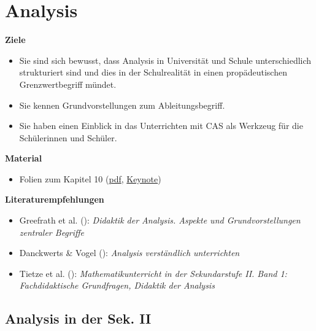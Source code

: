 \documentclass[
]{scrbook}
\providecommand{\tightlist}{%
  \setlength{\itemsep}{0pt}\setlength{\parskip}{0pt}}
\renewenvironment{quote}{
  \list{}{
	\leftmargin0.2cm   %
    \rightmargin\leftmargin
      	\def\FrameCommand
    {%
        {\color{quoteColor}\vrule width 2pt}%
        \hspace{0pt}%
    }%
    \MakeFramed{\advance \hsize -\width \FrameRestore}    \color{quoteColor}
    }
  \item\relax
}
{\endlist\color{black}\endMakeFramed}
\theoremstyle{definition}
\theoremstyle{definition}
\theoremstyle{definition}
\theoremstyle{definition}
\theoremstyle{remark}
\begin{document}
\chapter{Analysis}\label{analysis}

\begin{quote}
\textbf{Ziele}

\begin{itemize}
\tightlist
\item
  Sie sind sich bewusst, dass Analysis in Universität und Schule unterschiedlich strukturiert sind und dies in der Schulrealität in einen propädeutischen Grenzwertbegriff mündet.\\
\item
  Sie kennen Grundvorstellungen zum Ableitungsbegriff.\\
\item
  Sie haben einen Einblick in das Unterrichten mit CAS als Werkzeug für die Schülerinnen und Schüler.
\end{itemize}

\textbf{Material}

\begin{itemize}
\tightlist
\item
  Folien zum Kapitel 10 (\href{files/Stoffdidaktik2024-10-Analysis.pdf}{pdf}, \href{files/Stoffdidaktik2024-10-Analysis.key}{Keynote})
\end{itemize}

\textbf{Literaturempfehlungen}

\begin{itemize}
\tightlist
\item
  Greefrath et al. (): \emph{Didaktik der Analysis. Aspekte und Grundvorstellungen zentraler Begriffe}
\item
  Danckwerts \& Vogel (): \emph{Analysis verständlich unterrichten}
\item
  Tietze et al. (): \emph{Mathematikunterricht in der Sekundarstufe II. Band 1: Fachdidaktische Grundfragen, Didaktik der Analysis}
\end{itemize}
\end{quote}

\section{Analysis in der Sek. II}\label{analysis-in-der-sek.-ii}
\end{document}
